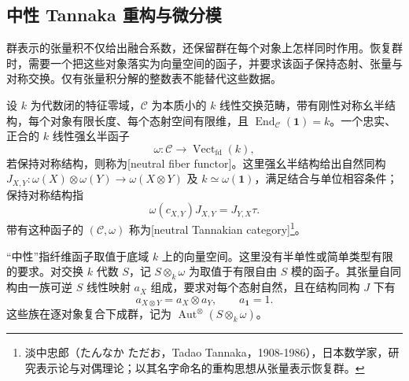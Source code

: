 \subsection{中性 Tannaka 重构与微分模}
\label{b5:subsec:B05:04}

群表示的张量积不仅给出融合系数，还保留群在每个对象上怎样同时作用。恢复群时，需要一个把这些对象落实为向量空间的函子，并要求该函子保持态射、张量与对称交换。仅有张量积分解的整数表不能替代这些数据。

\begin{definition}\label{b5:def:B-neutral-fiber}
	设 \(k\) 为代数闭的特征零域，\(\mathcal C\) 为本质小的 \(k\) 线性交换范畴，带有刚性对称幺半结构，每个对象有限长度、每个态射空间有限维，且 \(\operatorname{End}_{\mathcal C}(\mathbf1)=k\)。一个忠实、正合的 \(k\) 线性强幺半函子
	\[
		\omega:\mathcal C\longrightarrow\operatorname{Vect}_{\mathrm{fd}}(k),
	\]
	若保持对称结构，则称为[neutral fiber functor]。这里强幺半结构给出自然同构 \(J_{X,Y}:\omega(X)\otimes\omega(Y)\to\omega(X\otimes Y)\) 及 \(k\simeq\omega(\mathbf1)\)，满足结合与单位相容条件；保持对称结构指
	\[
		\omega(c_{X,Y})J_{X,Y}=J_{Y,X}\tau.
	\]
	带有这种函子的 \((\mathcal C,\omega)\) 称为[neutral Tannakian category]\footnote{淡中忠郎（たんなか ただお，Tadao Tannaka，1908-1986），日本数学家，研究表示论与对偶理论；以其名字命名的重构思想从张量表示恢复群。}。
\end{definition}

“中性”指纤维函子取值于底域 \(k\) 上的向量空间。这里没有半单性或简单类型有限的要求。对交换 \(k\) 代数 \(S\)，记 \(S\otimes_k\omega\) 为取值于有限自由 \(S\) 模的函子。其张量自同构由一族可逆 \(S\) 线性映射 \(a_X\) 组成，要求对每个态射自然，且在结构同构 \(J\) 下有
\[
	a_{X\otimes Y}=a_X\otimes a_Y,\qquad a_{\mathbf1}=1.
\]
这些族在逐对象复合下成群，记为 \(\operatorname{Aut}^{\otimes}(S\otimes_k\omega)\)。

